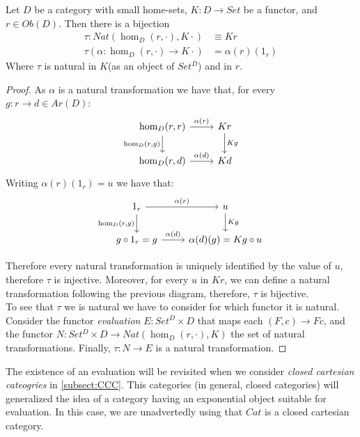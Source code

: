 \begin{theorem}\cite[Section 3.2]{mac2013categories}
  Let $D$ be a category with small home-sets, $K:D\to Set$ be a functor, and $r\in Ob(D)$. Then there is a bijection
  \begin{align*}
    \tau:Nat(\hom_D(r,\cdot), K\cdot) &\equiv Kr\\
    \tau(\alpha:\hom_D(r,\cdot)\to K\cdot)& = \alpha(r)(1_r)
  \end{align*}
  Where $\tau$ is natural in $K$(as an object of $Set^{D}$) and in $r$.
\end{theorem}
\begin{proof}
  As $\alpha$ is a natural transformation we have that, for every $g:r\to d\in Ar(D)$: 
  \[
    \begin{tikzcd}
      \hom_D(r,r)\arrow[swap]{d}{\hom_D(r,g)}\arrow{r}{\alpha(r)} & Kr\arrow{d}{Kg}\\
      \hom_D(r,d)\arrow{r}{\alpha(d)} & Kd
    \end{tikzcd}
  \]
  Writing $\alpha(r)(1_r) = u$ we have that:
  \[
    \begin{tikzcd}
      1_r\arrow[swap]{d}{\hom_D(r,g)}\arrow{r}{\alpha(r)} & u\arrow{d}{Kg}\\
      g\circ 1_r = g\arrow{r}{\alpha(d)} & \alpha(d)(g)=Kg\circ u
    \end{tikzcd}
  \]

  Therefore every natural transformation is uniquely identified by the value of $u$, therefore $\tau$ is injective. Moreover, for every $u$ in $Kr$, we can define a natural transformation following the previous diagram, therefore, $\tau$ is bijective.\\

  To see that $\tau$ we is natural we have to consider for which functor it is natural. Consider the functor \emph{evaluation} $E: Set^D\times D$ that maps each $(F,c)\to Fc$, and the functor $N:Set^D\times D\to Nat(\hom_D(r,\cdot),K)$ the set of natural transformations. Finally, $\tau:N\to E$ is a natural transformation.
\end{proof}
\begin{remark}
  The existence of an evaluation will be revisited when we consider \emph{closed cartesian cateogries} in  \ref{subsect:CCC}. This categories (in general, closed categories) will generalized the idea of a category having an exponential object suitable for evaluation. In this case, we are unadvertedly using that $Cat$ is a closed cartesian category.
\end{remark}

